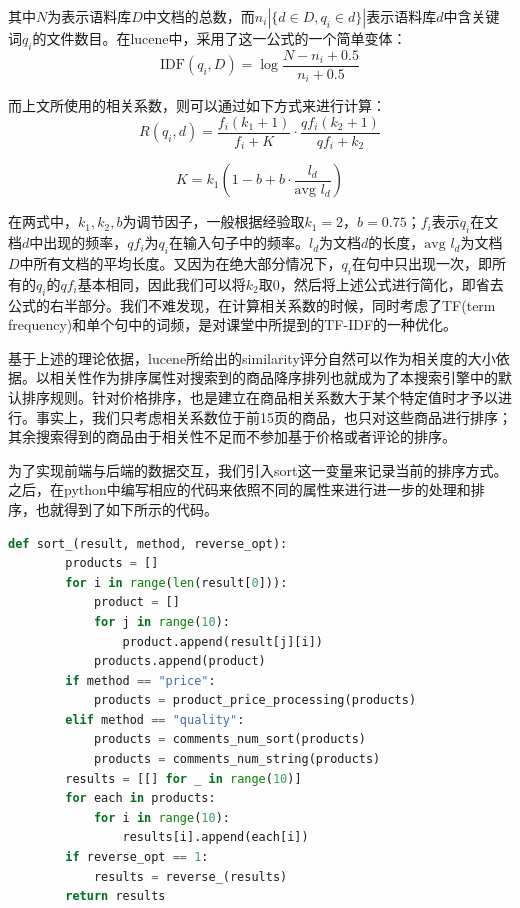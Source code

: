 \documentclass[a4paper,12pt]{article}
\begin{document}
    其中$N$为表示语料库$D$中文档的总数，而$n_i|\{d\in D, q_i\in d\}|$表示语料库$d$中含关键词$q_i$的文件数目。在lucene中，采用了这一公式的一个简单变体：
    \begin{equation}
        \text{IDF}(q_i, D)=\log \frac{N-n_i+0.5}{n_i+0.5}
    \end{equation}
    
    而上文所使用的相关系数，则可以通过如下方式来进行计算：
    \begin{equation}
        R(q_i, d)=\frac{f_i(k_1+1)}{f_i+K}\cdot \frac{qf_i(k_2+1)}{qf_i+k_2}
    \end{equation}
    
    \begin{equation}
        K=k_1(1-b+b\cdot \frac{l_d}{\text{avg }l_d})
    \end{equation}
    
    在两式中，$k_1, k_2, b$为调节因子，一般根据经验取$k_1=2$，$b=0.75$；$f_i$表示$q_i$在文档$d$中出现的频率，$qf_i$为$q_i$在输入句子中的频率。$l_d$为文档$d$的长度，$\text{avg }l_d$为文档$D$中所有文档的平均长度。又因为在绝大部分情况下，$q_i$在句中只出现一次，即所有的$q_i$的$qf_i$基本相同，因此我们可以将$k_2$取0，然后将上述公式进行简化，即省去公式的右半部分。我们不难发现，在计算相关系数的时候，同时考虑了TF(term frequency)和单个句中的词频，是对课堂中所提到的TF-IDF的一种优化。

    基于上述的理论依据，lucene所给出的similarity评分自然可以作为相关度的大小依据。以相关性作为排序属性对搜索到的商品降序排列也就成为了本搜索引擎中的默认排序规则。针对价格排序，也是建立在商品相关系数大于某个特定值时才予以进行。事实上，我们只考虑相关系数位于前15页的商品，也只对这些商品进行排序；其余搜索得到的商品由于相关性不足而不参加基于价格或者评论的排序。

    为了实现前端与后端的数据交互，我们引入sort这一变量来记录当前的排序方式。之后，在python中编写相应的代码来依照不同的属性来进行进一步的处理和排序，也就得到了如下所示的代码。

    \begin{lstlisting}[language=python]
    def sort_(result, method, reverse_opt):
        products = []
        for i in range(len(result[0])):
            product = []
            for j in range(10):
                product.append(result[j][i])
            products.append(product)
        if method == "price":
            products = product_price_processing(products)
        elif method == "quality":
            products = comments_num_sort(products)
            products = comments_num_string(products)
        results = [[] for _ in range(10)]
        for each in products:
            for i in range(10):
                results[i].append(each[i])        
        if reverse_opt == 1:
            results = reverse_(results)
        return results
    \end{lstlisting}
\end{document}
